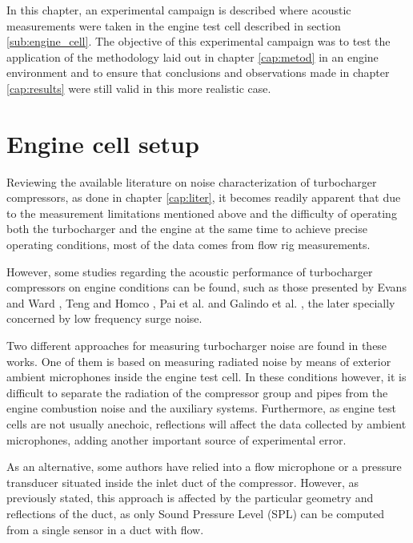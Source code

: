 In this chapter, an experimental campaign is described where acoustic measurements were taken in the engine test cell described in section \ref{sub:engine_cell}. The objective of this experimental campaign was to test the application of the methodology laid out in chapter \ref{cap:metod} in an engine environment and to ensure that conclusions and observations made in chapter \ref{cap:results} were still valid in this more realistic case.

\section{Engine cell setup}
\label{sec:experimental_characterization}

Reviewing the available literature on noise characterization of turbocharger compressors, as done in chapter \ref{cap:liter}, it becomes readily apparent that due to the measurement limitations mentioned above and the difficulty of operating both the turbocharger and the engine at the same time to achieve precise operating conditions, most of the data comes from flow rig measurements.

However, some studies regarding the acoustic performance of turbocharger compressors on engine conditions can be found, such as those presented by Evans and Ward \cite{evans2005minimizing,evans2006reduction}, Teng and Homco \cite{teng2009investigation},  Pai et al. \cite{pai2013air,pai2015turbocharger} and Galindo et al. \cite{galindo2013engine,galindo2011measurement,galindo2008experiments}, the later specially concerned by low frequency surge noise.

Two different approaches for measuring turbocharger noise are found  in these works. One of them is based on measuring radiated noise by means of exterior ambient microphones inside the engine test cell. In these conditions however, it is difficult to separate the radiation of the compressor group and pipes from the engine combustion noise and the auxiliary systems. Furthermore, as engine test cells are not usually anechoic, reflections will affect the data collected by ambient microphones, adding another important source of experimental error.

As an alternative, some authors have relied into a flow microphone or a pressure transducer situated inside the inlet duct of the compressor. However, as previously stated, this approach is affected by the particular geometry and reflections of the duct, as only Sound Pressure Level (SPL) can be computed from a single sensor in a duct with flow.

